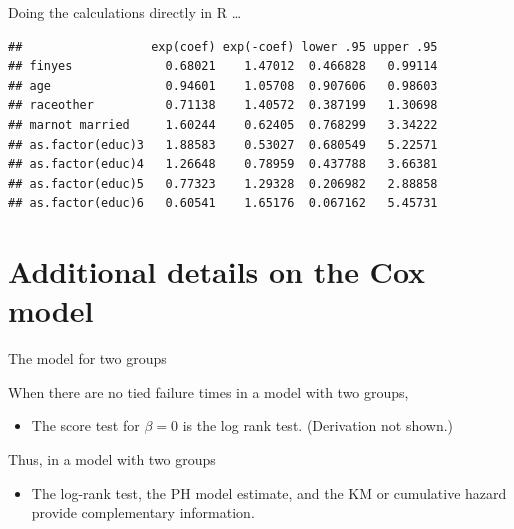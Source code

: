 \documentclass[ignorenonframetext,]{beamer}
\newenvironment{Shaded}{\begin{snugshade}}{\end{snugshade}}
\newcommand{\DataTypeTok}[1]{\textcolor[rgb]{0.13,0.29,0.53}{#1}}
\newcommand{\KeywordTok}[1]{\textcolor[rgb]{0.13,0.29,0.53}{\textbf{#1}}}
\newcommand{\NormalTok}[1]{#1}
\newcommand{\OperatorTok}[1]{\textcolor[rgb]{0.81,0.36,0.00}{\textbf{#1}}}
\newcommand{\StringTok}[1]{\textcolor[rgb]{0.31,0.60,0.02}{#1}}
\providecommand{\tightlist}{%
  \setlength{\itemsep}{0pt}\setlength{\parskip}{0pt}}
\begin{document}
\begin{frame}[fragile]{%
\protect\hypertarget{doing-the-calculations-directly-in-r-1}{%
Doing the calculations directly in R \ldots}}

\footnotesize

\begin{Shaded}
\end{Shaded}

\begin{verbatim}
##                  exp(coef) exp(-coef) lower .95 upper .95
## finyes             0.68021    1.47012  0.466828   0.99114
## age                0.94601    1.05708  0.907606   0.98603
## raceother          0.71138    1.40572  0.387199   1.30698
## marnot married     1.60244    0.62405  0.768299   3.34222
## as.factor(educ)3   1.88583    0.53027  0.680549   5.22571
## as.factor(educ)4   1.26648    0.78959  0.437788   3.66381
## as.factor(educ)5   0.77323    1.29328  0.206982   2.88858
## as.factor(educ)6   0.60541    1.65176  0.067162   5.45731
\end{verbatim}

\end{frame}

\hypertarget{additional-details-on-the-cox-model}{%
\section{Additional details on the Cox
model}\label{additional-details-on-the-cox-model}}

\begin{frame}{%
\protect\hypertarget{the-model-for-two-groups}{%
The model for two groups}}

When there are no tied failure times in a model with two groups,

\begin{itemize}
\tightlist
\item
  The score test for \(\beta = 0\) is the log rank test. (Derivation not
  shown.)
\end{itemize}

Thus, in a model with two groups

\begin{itemize}
\tightlist
\item
  The log-rank test, the PH model estimate, and the KM or cumulative
  hazard provide complementary information.
\end{itemize}

\end{frame}
\end{document}
